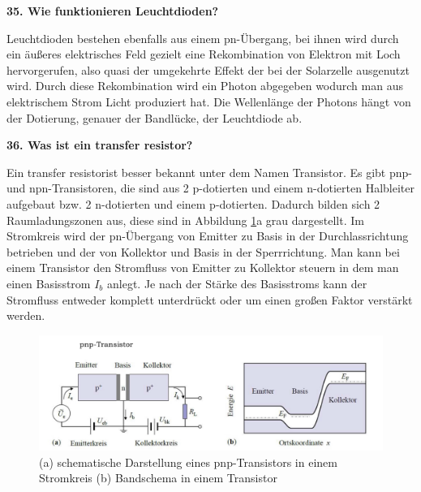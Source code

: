 \noindent\textbf{35. Wie funktionieren Leuchtdioden?}\\
\begin{addmargin}[25pt]{0pt}
Leuchtdioden bestehen ebenfalls aus einem pn-Übergang, bei ihnen wird durch ein äußeres elektrisches Feld gezielt eine Rekombination von Elektron mit Loch hervorgerufen, also quasi der umgekehrte Effekt der bei der Solarzelle ausgenutzt wird. Durch diese Rekombination wird ein Photon abgegeben wodurch man aus elektrischem Strom Licht produziert hat. Die Wellenlänge der Photons hängt von der Dotierung, genauer der Bandlücke, der Leuchtdiode ab. \\
\end{addmargin}

\noindent\textbf{36. Was ist ein \glqq transfer resistor\grqq ?}\\
\begin{addmargin}[25pt]{0pt}
Ein \glqq transfer resistor\grqq ist besser bekannt unter dem Namen Transistor. Es gibt pnp- und npn-Transistoren, die sind aus 2 p-dotierten und einem n-dotierten Halbleiter aufgebaut bzw. 2 n-dotierten und einem p-dotierten. Dadurch bilden sich 2 Raumladungszonen aus, diese sind in Abbildung \ref{fig:Transistor}a grau dargestellt. Im Stromkreis wird der pn-Übergang von Emitter zu Basis in der Durchlassrichtung betrieben und der von Kollektor und Basis in der Sperrrichtung. Man kann bei einem Transistor den Stromfluss von Emitter zu Kollektor steuern in dem man einen Basisstrom $I_b$ anlegt. Je nach der Stärke des Basisstroms kann der Stromfluss entweder komplett unterdrückt oder um einen großen Faktor verstärkt werden.\\
\begin{figure}[h]
    \centering
    \includegraphics[width = \textwidth]{images/KM2/Transistor.jpeg}
    \caption{(a) schematische Darstellung eines pnp-Transistors in einem Stromkreis (b) Bandschema in einem Transistor}
    \label{fig:Transistor}
\end{figure}
\end{addmargin}

